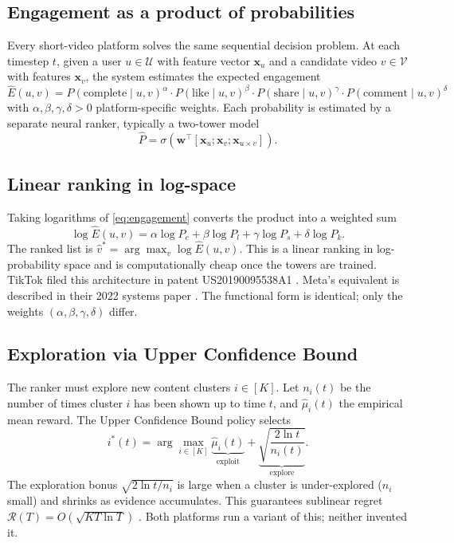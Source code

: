 \documentclass[12pt,a4paper]{article}
\begin{document}
\subsection{Engagement as a product of probabilities}

Every short-video platform solves the same sequential decision problem. At each timestep $t$, given a user $u \in \mathcal{U}$ with feature vector $\mathbf{x}_u$ and a candidate video $v \in \mathcal{V}$ with features $\mathbf{x}_v$, the system estimates the expected engagement
\begin{equation}
  \hat{E}(u, v) = P(\text{complete} \mid u, v)^\alpha \cdot P(\text{like} \mid u, v)^\beta \cdot P(\text{share} \mid u, v)^\gamma \cdot P(\text{comment} \mid u, v)^\delta
  \label{eq:engagement}
\end{equation}
with $\alpha, \beta, \gamma, \delta > 0$ platform-specific weights. Each probability is estimated by a separate neural ranker, typically a two-tower model
\begin{equation}
  \hat{P} = \sigma\!\left(\mathbf{w}^{\top} [\mathbf{x}_u; \mathbf{x}_v; \mathbf{x}_{u \times v}]\right).
  \label{eq:twotower}
\end{equation}

\subsection{Linear ranking in log-space}

Taking logarithms of \eqref{eq:engagement} converts the product into a weighted sum
\begin{equation}
  \log \hat{E}(u, v) = \alpha \log P_c + \beta \log P_l + \gamma \log P_s + \delta \log P_k.
  \label{eq:log_engagement}
\end{equation}
The ranked list is $\hat{v}^* = \arg\max_v \log \hat{E}(u, v)$. This is a linear ranking in log-probability space and is computationally cheap once the towers are trained. TikTok filed this architecture in patent US20190095538A1 \cite{tiktok2019patent}. Meta's equivalent is described in their 2022 systems paper \cite{meta2022systems}. The functional form is identical; only the weights $(\alpha, \beta, \gamma, \delta)$ differ.

\subsection{Exploration via Upper Confidence Bound}

The ranker must explore new content clusters $i \in [K]$. Let $n_i(t)$ be the number of times cluster $i$ has been shown up to time $t$, and $\hat{\mu}_i(t)$ the empirical mean reward. The Upper Confidence Bound policy selects
\begin{equation}
  i^*(t) = \arg\max_{i \in [K]} \underbrace{\hat{\mu}_i(t)}_{\text{exploit}} + \underbrace{\sqrt{\frac{2 \ln t}{n_i(t)}}}_{\text{explore}}.
  \label{eq:ucb}
\end{equation}
The exploration bonus $\sqrt{2 \ln t / n_i}$ is large when a cluster is under-explored ($n_i$ small) and shrinks as evidence accumulates. This guarantees sublinear regret $\mathcal{R}(T) = O(\sqrt{KT \ln T})$ \cite{auer2002}. Both platforms run a variant of this; neither invented it.
\end{document}
